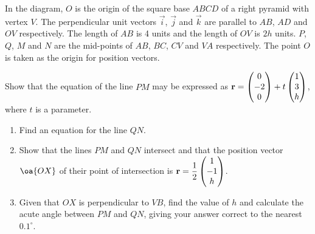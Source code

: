 \documentclass{echw}
\begin{document}
    \problem{}
        \begin{center}
        \end{center}
        In the diagram, $O$ is the origin of the square base $ABCD$ of a right pyramid with vertex $V$. The perpendicular unit vectors $\vec i$, $\vec j$ and $\vec k$ are parallel to $AB$, $AD$ and $OV$ respectively. The length of $AB$ is 4 units and the length of $OV$ is $2h$ units. $P$, $Q$, $M$ and $N$ are the mid-points of $AB$, $BC$, $CV$ and $VA$ respectively. The point $O$ is taken as the origin for position vectors.

        Show that the equation of the line $PM$ may be expressed as $\mathbf{r} = \begin{pmatrix} 0 \\ -2 \\ 0 \end{pmatrix} + t\begin{pmatrix} 1 \\ 3 \\ h \end{pmatrix}$, where $t$ is a parameter.

        \begin{enumerate}
            \item Find an equation for the line $QN$.
            \item Show that the lines $PM$ and $QN$ intersect and that the position vector $\oa{OX}$ of their point of intersection is $\mathbf{r} = \dfrac12 \begin{pmatrix} 1 \\ -1 \\ h \end{pmatrix}$.
            \item Given that $OX$ is perpendicular to $VB$, find the value of $h$ and calculate the acute angle between $PM$ and $QN$, giving your answer correct to the nearest $0.1^{\circ}$.
        \end{enumerate}
\end{document}
